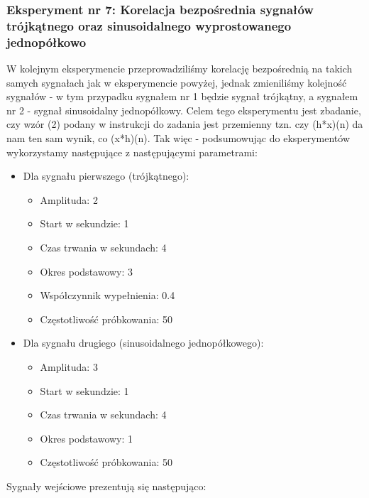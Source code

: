 \documentclass[12pt]{article}
\begin{document}
\subsubsection{Eksperyment nr 7: Korelacja bezpośrednia sygnałów trójkątnego oraz sinusoidalnego wyprostowanego jednopółkowo}
W kolejnym eksperymencie przeprowadziliśmy korelację bezpośrednią na takich samych sygnałach jak w eksperymencie powyżej, jednak zmieniliśmy kolejność sygnałów - w tym przypadku sygnałem nr 1 będzie sygnał trójkątny, a sygnałem nr 2 - sygnał sinusoidalny jednopółkowy. Celem tego eksperymentu jest zbadanie, czy wzór (2) podany w instrukcji do zadania \cite{instrukcja} jest przemienny tzn. czy (h*x)(n) da nam ten sam wynik, co (x*h)(n). Tak więc - podsumowując do eksperymentów wykorzystamy następujące z następującymi parametrami:
\begin{itemize}
    \item Dla sygnału pierwszego (trójkątnego):
    \begin{itemize}
        \item Amplituda: 2
        \item Start w sekundzie: 1
        \item Czas trwania w sekundach: 4
        \item Okres podstawowy: 3
        \item Współczynnik wypełnienia: 0.4
        \item Częstotliwość próbkowania: 50
    \end{itemize}
    \item Dla sygnału drugiego (sinusoidalnego jednopółkowego): 
    \begin{itemize}
        \item Amplituda: 3
        \item Start w sekundzie: 1
        \item Czas trwania w sekundach: 4
        \item Okres podstawowy: 1
        \item Częstotliwość próbkowania: 50
    \end{itemize}
\end{itemize}
Sygnały wejściowe prezentują się następująco:
\end{document}
